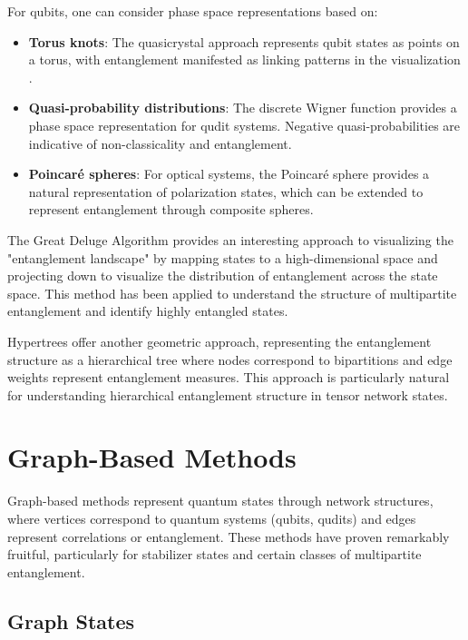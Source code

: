 \documentclass[12pt,a4paper]{article}
\begin{document}
For qubits, one can consider phase space representations based on:
\begin{itemize}
	\item \textbf{Torus knots}: The quasicrystal approach represents qubit states as points on a torus, with entanglement manifested as linking patterns in the visualization \cite{Undermind}.
	\item \textbf{Quasi-probability distributions}: The discrete Wigner function provides a phase space representation for qudit systems. Negative quasi-probabilities are indicative of non-classicality and entanglement.
	\item \textbf{Poincaré spheres}: For optical systems, the Poincaré sphere provides a natural representation of polarization states, which can be extended to represent entanglement through composite spheres.
\end{itemize}

The Great Deluge Algorithm \cite{great-deluge} provides an interesting approach to visualizing the "entanglement landscape" by mapping states to a high-dimensional space and projecting down to visualize the distribution of entanglement across the state space. This method has been applied to understand the structure of multipartite entanglement and identify highly entangled states.

Hypertrees \cite{hypertree} offer another geometric approach, representing the entanglement structure as a hierarchical tree where nodes correspond to bipartitions and edge weights represent entanglement measures. This approach is particularly natural for understanding hierarchical entanglement structure in tensor network states.

\section{Graph-Based Methods}
\label{sec:graph}

Graph-based methods represent quantum states through network structures, where vertices correspond to quantum systems (qubits, qudits) and edges represent correlations or entanglement. These methods have proven remarkably fruitful, particularly for stabilizer states and certain classes of multipartite entanglement.

\subsection{Graph States}
\label{sec:graph-states}
\end{document}

